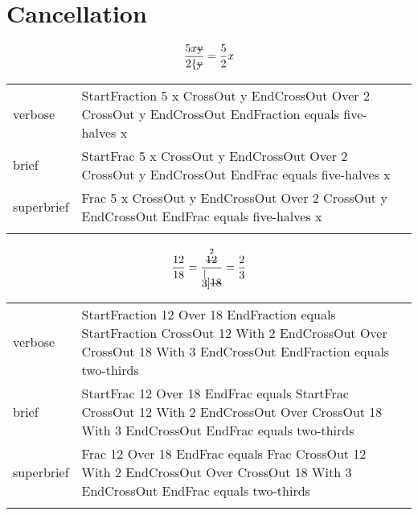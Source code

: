 
\section{Cancellation}
\label{sec:cancellation}

\R
\E \[\frac{5x\sout{y}}{2\{\sout{y}}=\frac{5}{2}x\]
\begin{longtable}[c]{@{}lll@{}}
\toprule\addlinespace
verbose & StartFraction 5 x CrossOut y EndCrossOut Over 2 CrossOut y
EndCrossOut EndFraction equals five-halves x &

\\\addlinespace
brief & StartFrac 5 x CrossOut y EndCrossOut Over 2 CrossOut y
EndCrossOut EndFrac equals five-halves x &

\\\addlinespace
superbrief & Frac 5 x CrossOut y EndCrossOut Over 2 CrossOut y
EndCrossOut EndFrac equals five-halves x &

\\\addlinespace
\bottomrule
\end{longtable}


\R
\E \[\frac{12}{18}=\frac{\stackrel{2}{\sout{12}}}{\stackrel[3]{\sout{18}}{}}=\frac{2}{3}\]
\begin{longtable}[c]{@{}lll@{}}
\toprule\addlinespace
verbose & StartFraction 12 Over 18 EndFraction equals StartFraction
CrossOut 12 With 2 EndCrossOut Over CrossOut 18 With 3 EndCrossOut
EndFraction equals two-thirds &

\\\addlinespace
brief & StartFrac 12 Over 18 EndFrac equals StartFrac CrossOut 12 With 2
EndCrossOut Over CrossOut 18 With 3 EndCrossOut EndFrac equals
two-thirds &

\\\addlinespace
superbrief & Frac 12 Over 18 EndFrac equals Frac CrossOut 12 With 2
EndCrossOut Over CrossOut 18 With 3 EndCrossOut EndFrac equals
two-thirds &

\\\addlinespace
\bottomrule
\end{longtable}




